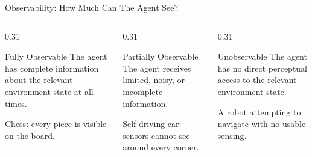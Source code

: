 \documentclass[aspectratio=169,10pt]{beamer}
\begin{document}
\begin{frame}{Observability: How Much Can The Agent See?}
  \begin{columns}[T,onlytextwidth]
    \begin{column}{0.31\textwidth}
      \begin{block}{Fully Observable}
        The agent has complete information about the relevant environment state at all times.
      \end{block}
      \begin{exampleblockcp}
        Chess: every piece is visible on the board.
      \end{exampleblockcp}
    \end{column}
    \begin{column}{0.31\textwidth}
      \begin{block}{Partially Observable}
        The agent receives limited, noisy, or incomplete information.
      \end{block}
      \begin{exampleblockcp}
        Self-driving car: sensors cannot see around every corner.
      \end{exampleblockcp}
    \end{column}
    \begin{column}{0.31\textwidth}
      \begin{block}{Unobservable}
        The agent has no direct perceptual access to the relevant environment state.
      \end{block}
      \begin{exampleblockcp}
        A robot attempting to navigate with no usable sensing.
      \end{exampleblockcp}
    \end{column}
  \end{columns}
\end{frame}
\end{document}
